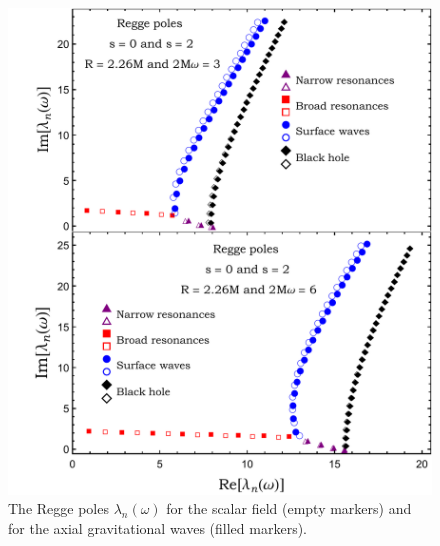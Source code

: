 \documentclass[aps,prd,longbibliography,reprint,twocolumn,amsmath,amssymb,amsfonts,showpacs,superscriptaddress]{revtex4-1}%
\begin{document}
 \begin{figure}[htb]
\centering
 \includegraphics[scale=0.50]{RP_R_2_dot_26_2Mw_3_6_s_0_s_2}
\caption{\label{RP_approx_2Mw_3_6_s_1}  The Regge poles $\lambda_n(\omega)$ for the scalar field (empty markers) and for the axial gravitational waves (filled markers). %
}
\label{fig:rp2}
\end{figure}
\end{document}
